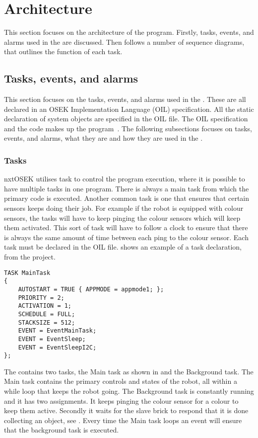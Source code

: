\section{Architecture} \label{sec:architecture}
This section focuses on the architecture of the program. Firstly, tasks, events, and alarms used in the \projname{} are discussed. Then follows a number of sequence diagrams, that outlines the function of each task. 


\subsection{Tasks, events, and alarms} \label{sec:task-events-alarms}
This section focuses on the tasks, events, and alarms used in the \projname{}. These are all declared in an OSEK Implementation Language (OIL) specification. All the static declaration of system objects are specified in the OIL file. The OIL specification and the code makes up the program~\citep{nxtOSEK2}. The following subsections focuses on tasks, events, and alarms, what they are and how they are used in the \projname{}.

\subsubsection{Tasks} \label{sec:tasks}
nxtOSEK utilises task to control the program execution, where it is possible to have multiple tasks in one program. There is always a main task from which the primary code is executed. Another common task is one that ensures that certain sensors keeps doing their job. For example if the robot is equipped with colour sensors, the tasks will have to keep pinging the colour sensors which will keep them activated. This sort of task will have to follow a clock to ensure that there is always the same amount of time between each ping to the colour sensor. Each task must be declared in the OIL file.  shows an example of a task declaration, from the \projname{} project. 

\begin{lstlisting}[caption= An example of a task used in the \projname{}, label=lst:taskexample]
TASK MainTask
{
    AUTOSTART = TRUE { APPMODE = appmode1; };
    PRIORITY = 2;
    ACTIVATION = 1;
    SCHEDULE = FULL;
    STACKSIZE = 512;
    EVENT = EventMainTask;
    EVENT = EventSleep;
    EVENT = EventSleepI2C;
};
\end{lstlisting}

The \projname{} contains two tasks, the Main task as shown in  and the Background task. The Main task contains the primary controls and states of the robot, all within a while loop that keeps the robot going. The Background task is constantly running and it has two assignments. It keeps pinging the colour sensor for a colour to keep them active. Secondly it waits for the slave brick to respond that it is done collecting an object, see . Every time the Main task loops an event will ensure that the background task is executed.

